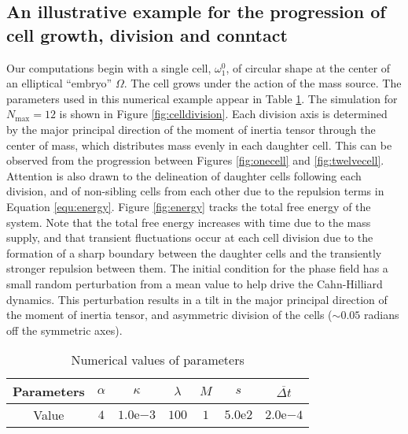 \documentclass{article}
\begin{document}
\subsection{An illustrative example for the progression of cell growth, division and conntact}
Our computations begin with a single cell, $\omega_1^0$, of circular shape at the center of an elliptical ``embryo'' $\Omega$. The cell grows under the action of the mass source. The parameters used in this numerical example appear in Table \ref{tab:parameter}. The simulation for $N_\text{max} = 12$ is shown in Figure \ref{fig:celldivision}. Each division axis is determined by the major principal direction of the moment of inertia tensor through the center of mass, which distributes mass evenly in each daughter cell. This can be observed from the progression between Figures \ref{fig:onecell} and \ref{fig:twelvecell}. Attention is also drawn to the delineation of daughter cells following each division, and of non-sibling cells from each other due to the repulsion terms in Equation \eqref{equ:energy}.  Figure \ref{fig:energy} tracks the total free energy of the system. Note that the total free energy increases with time due to the mass supply, and that transient fluctuations occur at each cell division due to the formation of a sharp boundary between the daughter cells and the transiently stronger repulsion between them. The initial condition for the phase field has a small random perturbation from a mean value to help drive the Cahn-Hilliard dynamics. This perturbation results in a tilt in the major principal direction of the moment of inertia tensor, and asymmetric division of the cells ($\sim 0.05$ radians off the symmetric axes).
\begin{table}[h!]
	\caption{Numerical values of parameters}
	\begin{center}
		\begin{tabular}{|c|c|c|c|c|c|c|}
			\hline
			Parameters & $\alpha$ & $\kappa$ & $\lambda$ & $M$ & $s$ & $\overline{\Delta t}$\\
			\hline
			Value & $4$ & $1.0\mathrm{e}{-3}$ & $100$ & $1$ & $5.0\mathrm{e}2$ & $2.0\mathrm{e}{-4}$\\
			\hline
		\end{tabular}
	\end{center}
	\label{tab:parameter}
\end{table}
\end{document}
